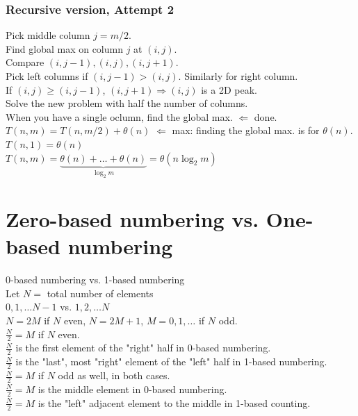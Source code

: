 \documentclass[10pt]{amsart}
\begin{document}
\begin{multicols*}{2}
\subsubsection{Recursive version, Attempt 2}

Pick middle column $j =m/2$. \\
Find global max on column $j$ at $(i, j)$. \\
Compare $(i, j -1), (i, j), (i, j +1)$. \\
Pick left columns if $(i,j-1) > (i,j)$. Similarly for right column. \\

If $(i,j) \geq (i,j-1)$, $(i, j+1) \Longrightarrow (i,j)$ is a 2D peak. \\
Solve the new problem with half the number of columns. \\
When you have a single oclumn, find the global max. $\Longleftarrow$ done. \\

$T(n,m) = T(n,m/2) + \theta(n)$ $\Longleftarrow $ max: finding the global max. is for $\theta(n)$. \\
$T(n, 1) = \theta(n)$ \\
$T(n, m)  = \underbrace{\theta(n) + \dots + \theta(n)}_{\log_2{m} } = \theta(n\log_2{m})$ \\

\section{Zero-based numbering vs. One-based numbering}

0-based numbering vs. 1-based numbering \\
Let $N=$ total number of elements \\

$0,1, \dots N-1$ vs. $1, 2, \dots N$ \\
$N = 2M$ if $N$ even, $N = 2M+1$, $M=0,1, \dots $ if $N$ odd. \\
$\frac{N}{2} = M$ if $N$ even. \\
$\frac{N}{2}$ is the first element of the "right" half in $0$-based numbering. \\
$\frac{N}{2}$ is the "last", most "right" element of the "left" half in 1-based numbering. \\

$\frac{N}{2} = M$ if $N$ odd as well, in both cases. \\
$\frac{N}{2} = M$ is the middle element in 0-based numbering. \\
$\frac{N}{2} = M$ is the "left" adjacent element to the middle in 1-based counting.


\end{multicols*}
\end{document}
